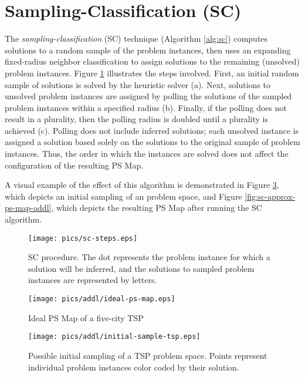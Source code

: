 \section{Sampling-Classification (SC)}
The \textit{sampling-classification} (SC) technique (Algorithm \ref{alg:sc}) computes solutions to a random sample of the problem instances, then uses an expanding fixed-radius neighbor classification to assign solutions to the remaining (unsolved) problem instances.  Figure \ref{fig:sc-steps} illustrates the steps involved.  First, an initial random sample of solutions is solved by the heuristic solver (a).  Next, solutions to unsolved problem instances are assigned by polling the solutions of the sampled problem instances within a specified radius (b).  Finally, if the polling does not result in a plurality, then the polling radius is doubled until a plurality is achieved (c).  Polling does not include inferred solutions; each unsolved instance is assigned a solution based solely on the solutions to the original sample of problem instances.  Thus, the order in which the instances are solved does not affect the configuration of the resulting PS Map.

A visual example of the effect of this algorithm is demonstrated in Figure \ref{fig:initial-sample-tsp-addl}, which depicts an initial sampling of an problem space, and Figure \ref{fig:sc-approx-ps-map-addl}, which depicts the resulting PS Map after running the SC algorithm.

\begin{figure}
\begin{center}
    \texttt{[image: pics/sc-steps.eps]}
    \caption{SC procedure.  The dot represents the problem instance for which a solution will be inferred, and the solutions to sampled problem instances are represented by letters.}
    \label{fig:sc-steps}
\end{center}
\end{figure}

\begin{figure}
\begin{center}
    \texttt{[image: pics/addl/ideal-ps-map.eps]}
    \caption{Ideal PS Map of a five-city TSP}
    \label{fig:ideal-ps-map-addl}
\end{center}
\end{figure}

\begin{figure}
\begin{center}
    \texttt{[image: pics/addl/initial-sample-tsp.eps]}
    \caption{Possible initial sampling of a TSP problem space.  Points represent individual problem instances color coded by their solution.}
    \label{fig:initial-sample-tsp-addl}
\end{center}
\end{figure}

